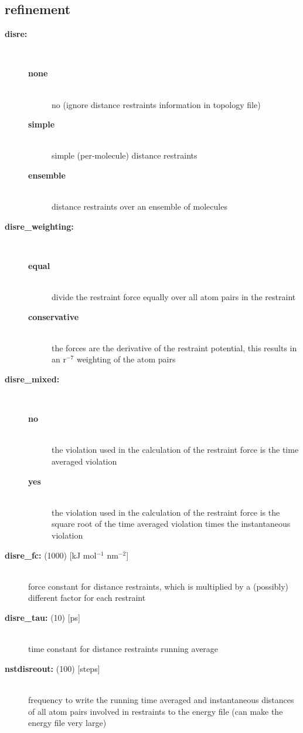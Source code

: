 \subsection{ refinement}
\begin{description}
\item[{\bf disre:}]\mbox{}\\
\vspace{-2ex}\begin{description}
\item[{\bf none}]\mbox{}\\
no  (ignore distance
restraints information in topology file)
\item[{\bf simple}]\mbox{}\\
simple (per-molecule) distance restraints
\item[{\bf ensemble}]\mbox{}\\
distance restraints over an ensemble of molecules
\end{description}
\item[{\bf disre\_weighting:}]\mbox{}\\
\vspace{-2ex}\begin{description}
\item[{\bf equal}]\mbox{}\\
divide the restraint force equally over all atom pairs in the restraint
\item[{\bf conservative}]\mbox{}\\
the forces are the derivative of the restraint potential,
this results in an r$^{-7}$ weighting of the atom pairs
\end{description}
\item[{\bf disre\_mixed:}]\mbox{}\\
\vspace{-2ex}\begin{description}
\item[{\bf no}]\mbox{}\\
the violation used in the calculation of the restraint force is the
time averaged violation 
\item[{\bf yes}]\mbox{}\\
the violation used in the calculation of the restraint force is the
square root of the time averaged violation times the instantaneous violation 
\end{description}
\item[{\bf disre\_fc: }(1000) {[kJ mol$^{-1}$ nm$^{-2}$]}]\mbox{}\\
force constant for distance restraints, which is multiplied by a
(possibly) different factor for each restraint
\item[{\bf disre\_tau: }(10) {[ps]}]\mbox{}\\
time constant for distance restraints running average
\item[{\bf nstdisreout: }(100) {[steps]}]\mbox{}\\
frequency to write the running time averaged and instantaneous distances
of all atom pairs involved in restraints to the energy file
(can make the energy file very large)
\end{description}

